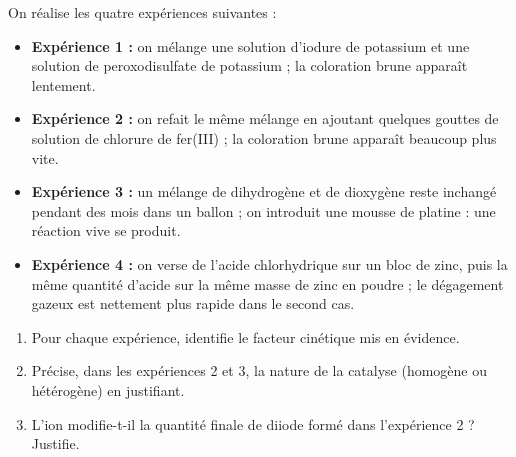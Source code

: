 \documentclass[11pt]{article}
\begin{document}
\begin{exercice}
On réalise les quatre expériences suivantes :
\begin{itemize}
\item \textbf{Expérience 1 :} on mélange une solution d'iodure de potassium et une solution de peroxodisulfate de potassium ; la coloration brune apparaît lentement.
\item \textbf{Expérience 2 :} on refait le même mélange en ajoutant quelques gouttes de solution de chlorure de fer(III) ; la coloration brune apparaît beaucoup plus vite.
\item \textbf{Expérience 3 :} un mélange de dihydrogène et de dioxygène reste inchangé pendant des mois dans un ballon ; on introduit une mousse de platine : une réaction vive se produit.
\item \textbf{Expérience 4 :} on verse de l'acide chlorhydrique sur un bloc de zinc, puis la même quantité d'acide sur la même masse de zinc en poudre ; le dégagement gazeux est nettement plus rapide dans le second cas.
\end{itemize}
\begin{enumerate}
\item Pour chaque expérience, identifie le facteur cinétique mis en évidence.
\item Précise, dans les expériences 2 et 3, la nature de la catalyse (homogène ou hétérogène) en justifiant.
\item L'ion  modifie-t-il la quantité finale de diiode formé dans l'expérience 2 ? Justifie.
\end{enumerate}
\end{exercice}
\end{document}
